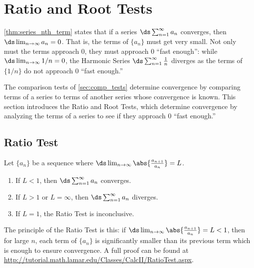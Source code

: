 \section{Ratio and Root Tests}\label{sec:ratio_root_tests}

\autoref{thm:series_nth_term} states that if a series $\ds\sum_{n=1}^\infty a_n$ converges, then $\ds \lim_{n\to \infty} a_n =0$. That is, the terms of $\{a_n\}$ must get very small. Not only must the terms approach 0, they must approach 0 ``fast enough'': while $\ds \lim_{n\to\infty}1/n=0$, the Harmonic Series $\ds\sum_{n=1}^\infty \frac1n$ diverges as the terms of $\{1/n\}$ do not approach 0 ``fast enough.''

The comparison tests of \autoref{sec:comp_tests} determine convergence by comparing terms of a series to terms of another series whose convergence is known. This section introduces the Ratio and Root Tests, which determine convergence by analyzing the terms of a series to see if they approach 0 ``fast enough.''

\subsection{Ratio Test}

{Let $\{a_n\}$ be a sequence where $\ds \lim_{n\to\infty}\abs{\frac{a_{n+1}}{a_n}} = L$.%
%
\begin{enumerate}
	\item If $L<1$, then $\ds\sum_{n=1}^\infty a_n$ converges.
	\item If $L>1$ or $L=\infty$, then $\ds\sum_{n=1}^\infty a_n$ diverges.
	\item If $L=1$, the Ratio Test is inconclusive.
\end{enumerate}}


The principle of the Ratio Test is this: if $\ds\lim_{n\to\infty}\abs{\frac{a_{n+1}}{a_n}} = L<1$, then for large $n$, each term of $\{a_n\}$ is significantly smaller than its previous term which is enough to ensure convergence.  A full proof can be found at \url{http://tutorial.math.lamar.edu/Classes/CalcII/RatioTest.aspx}.

